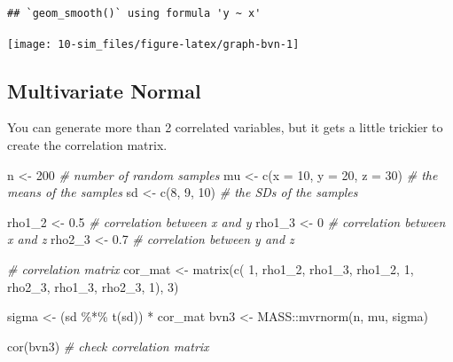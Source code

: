 \documentclass[
  oneside]{book}
\newenvironment{Shaded}{\begin{snugshade}}{\end{snugshade}}
\newcommand{\AttributeTok}[1]{\textcolor[rgb]{0.77,0.63,0.00}{#1}}
\newcommand{\CommentTok}[1]{\textcolor[rgb]{0.56,0.35,0.01}{\textit{#1}}}
\newcommand{\DecValTok}[1]{\textcolor[rgb]{0.00,0.00,0.81}{#1}}
\newcommand{\FloatTok}[1]{\textcolor[rgb]{0.00,0.00,0.81}{#1}}
\newcommand{\FunctionTok}[1]{\textcolor[rgb]{0.00,0.00,0.00}{#1}}
\newcommand{\NormalTok}[1]{#1}
\newcommand{\OtherTok}[1]{\textcolor[rgb]{0.56,0.35,0.01}{#1}}
\newcommand{\SpecialCharTok}[1]{\textcolor[rgb]{0.00,0.00,0.00}{#1}}
\begin{document}
\begin{verbatim}
## `geom_smooth()` using formula 'y ~ x'
\end{verbatim}

\begin{center}\texttt{[image: 10-sim\_files/figure-latex/graph-bvn-1]} \end{center}

\hypertarget{mvnorm}{%
\subsection{Multivariate Normal}\label{mvnorm}}

You can generate more than 2 correlated variables, but it gets a little trickier to create the correlation matrix.

\begin{Shaded}
\begin{Highlighting}[]
\NormalTok{n      }\OtherTok{\textless{}{-}} \DecValTok{200} \CommentTok{\# number of random samples}
\NormalTok{mu     }\OtherTok{\textless{}{-}} \FunctionTok{c}\NormalTok{(}\AttributeTok{x =} \DecValTok{10}\NormalTok{, }\AttributeTok{y =} \DecValTok{20}\NormalTok{, }\AttributeTok{z =} \DecValTok{30}\NormalTok{) }\CommentTok{\# the means of the samples}
\NormalTok{sd }\OtherTok{\textless{}{-}} \FunctionTok{c}\NormalTok{(}\DecValTok{8}\NormalTok{, }\DecValTok{9}\NormalTok{, }\DecValTok{10}\NormalTok{)   }\CommentTok{\# the SDs of the samples}

\NormalTok{rho1\_2 }\OtherTok{\textless{}{-}} \FloatTok{0.5} \CommentTok{\# correlation between x and y}
\NormalTok{rho1\_3 }\OtherTok{\textless{}{-}} \DecValTok{0}   \CommentTok{\# correlation between x and z}
\NormalTok{rho2\_3 }\OtherTok{\textless{}{-}} \FloatTok{0.7} \CommentTok{\# correlation between y and z}

\CommentTok{\# correlation matrix}
\NormalTok{cor\_mat }\OtherTok{\textless{}{-}} \FunctionTok{matrix}\NormalTok{(}\FunctionTok{c}\NormalTok{(     }\DecValTok{1}\NormalTok{, rho1\_2, rho1\_3, }
\NormalTok{                    rho1\_2,      }\DecValTok{1}\NormalTok{, rho2\_3,}
\NormalTok{                    rho1\_3, rho2\_3,      }\DecValTok{1}\NormalTok{), }\DecValTok{3}\NormalTok{) }

\NormalTok{sigma }\OtherTok{\textless{}{-}}\NormalTok{ (sd }\SpecialCharTok{\%*\%} \FunctionTok{t}\NormalTok{(sd)) }\SpecialCharTok{*}\NormalTok{ cor\_mat}
\NormalTok{bvn3 }\OtherTok{\textless{}{-}}\NormalTok{ MASS}\SpecialCharTok{::}\FunctionTok{mvrnorm}\NormalTok{(n, mu, sigma)}

\FunctionTok{cor}\NormalTok{(bvn3) }\CommentTok{\# check correlation matrix}
\end{Highlighting}
\end{Shaded}
\end{document}
